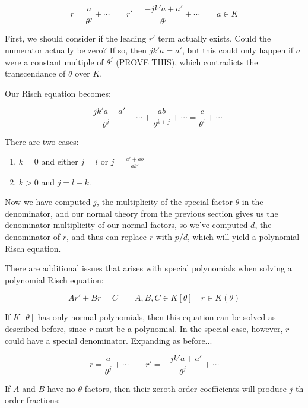
$$r = \frac{a}{\theta^j} + \cdots  \qquad  r' = \frac{-j k' a + a'}{\theta^{j}} + \cdots \qquad a \in K$$

First, we should consider if the leading $r'$ term actually exists.
Could the numerator actually be zero?  If so, then $j k' a = a'$,
but this could only happen if $a$ were a constant
multiple of $\theta^j$ (PROVE THIS), which contradicts the
transcendance of $\theta$ over $K$.

Our Risch equation becomes:

$$\frac{-j k' a + a'}{\theta^{j}} + \cdots + \frac{a b }{\theta^{k+j}} + \cdots
= \frac{c}{\theta^l} + \cdots$$

There are two cases:

\begin{enumerate}
\item $k=0$ and either $j=l$ or
$j = \frac{a' + a b}{a k'}$
\item $k>0$ and $j=l-k$.
\end{enumerate}

Now we have computed $j$, the multiplicity of the special factor
$\theta$ in the
denominator, and our normal theory from the previous section gives us
the denominator multiplicity of our normal factors, so
we've computed $d$, the denominator of $r$, and
thus can replace $r$ with $p/d$, which will
yield a polynomial Risch equation.

There are additional issues that arises with special polynomials when
solving a polynomial Risch equation:

\begin{equation}
\label{eq: special polynomial Risch}
A r' + B r = C \qquad A,B,C \in K[\theta] \quad r \in K(\theta)
\end{equation}

If $K[\theta]$ has only normal polynomials, then this equation can be
solved as described before, since $r$ must be a polynomial.
In the special case, however, $r$ could have a special denominator.
Expanding as before...

$$r = \frac{a}{\theta^j} + \cdots  \qquad  r' = \frac{-j k' a + a'}{\theta^{j}} + \cdots$$

If $A$ and $B$ have no $\theta$ factors, then their zeroth order coefficients will produce $j$-th order fractions:

